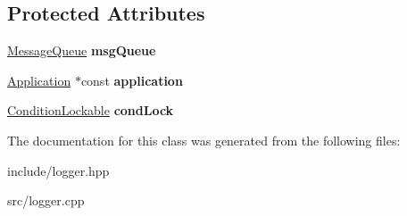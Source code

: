 \subsection*{Protected Attributes}
\begin{DoxyCompactItemize}
\item 
\hypertarget{classcore_1_1_t_s_queue_sink_adf21646ea0f49adf3dd8826468e750e8}{\hyperlink{classcore_1_1threading_1_1container_1_1_t_s_queue}{Message\-Queue} {\bfseries msg\-Queue}}\label{classcore_1_1_t_s_queue_sink_adf21646ea0f49adf3dd8826468e750e8}

\item 
\hypertarget{classcore_1_1_t_s_queue_sink_ab5d03e3ed40937453bd17409a5b6c615}{\hyperlink{classcore_1_1_application}{Application} $\ast$const {\bfseries application}}\label{classcore_1_1_t_s_queue_sink_ab5d03e3ed40937453bd17409a5b6c615}

\item 
\hypertarget{classcore_1_1_t_s_queue_sink_a5dd18b9d73b73b343f203bb1f622c60f}{\hyperlink{classcore_1_1threading_1_1container_1_1_t_s_wrapper}{Condition\-Lockable} {\bfseries cond\-Lock}}\label{classcore_1_1_t_s_queue_sink_a5dd18b9d73b73b343f203bb1f622c60f}

\end{DoxyCompactItemize}


The documentation for this class was generated from the following files\-:\begin{DoxyCompactItemize}
\item 
include/logger.\-hpp\item 
src/logger.\-cpp\end{DoxyCompactItemize}
